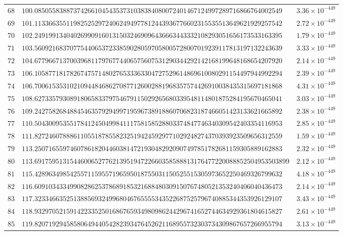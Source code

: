 \documentclass[12pt,reqno]{amsart}
\theoremstyle{remark}
\begin{document}
\begin{longtable}{clc}
$68$ & $100.0850558388737426610454353731038384080072401467124997289716866764002549$ & $3.36\times 10^{-449}$ \\
$69$ & $101.1133663551198252529724062494977812443936776602315535513649621929257542$ & $2.72\times 10^{-449}$ \\
$70$ & $102.2491991340402699091601315032469096436663443332108293051656173533163395$ & $1.79\times 10^{-449}$ \\
$71$ & $103.5609216837077544065372338590280597058005728007019239117813197132243639$ & $3.33\times 10^{-449}$ \\
$72$ & $104.6779667137003968117976774406575607531290344292142168199648168654207920$ & $2.14\times 10^{-449}$ \\
$73$ & $106.1058771817826747571480276533363304727529614869610080291154497944992294$ & $2.39\times 10^{-449}$ \\
$74$ & $106.7006153531021094484686270877126002881968357574426910038435315697181868$ & $4.31\times 10^{-449}$ \\
$75$ & $108.6273357930891806583379754679115029265680339548114801875284195670465041$ & $3.03\times 10^{-449}$ \\
$76$ & $109.2427582684884546357929499719596738918860706823187466051423133621665892$ & $2.38\times 10^{-449}$ \\
$77$ & $110.5043009535517841245049984111758158528803374847746340309542403354116953$ & $2.85\times 10^{-449}$ \\
$78$ & $111.8272460788861105518785582325194245929771029248274370393923509656312559$ & $1.59\times 10^{-449}$ \\
$79$ & $113.2507165597460786182044603814721930482920907497851782681159305889162883$ & $2.32\times 10^{-449}$ \\
$80$ & $113.691759513154460065277621395194722660358588813176477220088852504953503899$ & $2.12\times 10^{-449}$ \\
$81$ & $115.4289634985425571159557196595018755031150525515305973652250469326799632$ & $4.18\times 10^{-449}$ \\
$82$ & $116.6091034334990828625378689185321688480309150767480521353240406040436473$ & $2.14\times 10^{-449}$ \\
$83$ & $117.3233466352513885693249968046765555343522687525796740885344353926129107$ & $3.43\times 10^{-449}$ \\
$84$ & $118.9329705215914223352501686765934980986244296741652744634929361804615827$ & $2.61\times 10^{-449}$ \\
$85$ & $119.8207192945858064944054282393476452621168955732303734309867657266955794$ & $3.13\times 10^{-449}$ \\

\end{longtable}
\end{document}
